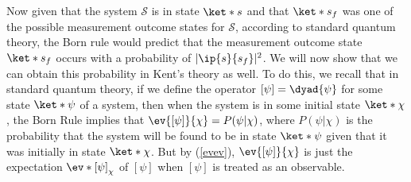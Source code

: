 \documentclass[12pt]{report}
\providecommand{\DIFaddend}{} %
\begin{document}

\DIFaddend 

Now given that the system $\mathcal{S}$ is in state $\ket*{s}$ and that $\ket*{s_f}$ was one of the possible measurement outcome states for $\mathcal{S}$, according to standard quantum theory, the Born rule would predict that the measurement outcome state $\ket*{s_f}$ occurs with a probability of $|\ip{s}{s_f}|^2$. We will now show that we can obtain this probability in Kent's theory as well. To do this, we recall that in standard quantum theory, if  we define the operator $[\psi]=\dyad{\psi}$ %
%
for some state $\ket*{\psi}$ of a system, then when the system is in some initial state $\ket*{\chi}$, the Born Rule implies that $\ev{[\psi]}{\chi}=P(\psi|\chi)$, where $P(\psi|\chi)$ is the probability that the system will be found to be in state $\ket*{\psi}$ given that it was initially in state $\ket*{\chi}$. But by (\ref{evev}),  $\ev{[\psi]}{\chi}$ is just the expectation $\ev*{[\psi]}_\chi$ of $[\psi]$ when $[\psi]$ is treated as an observable. 
\end{document}
